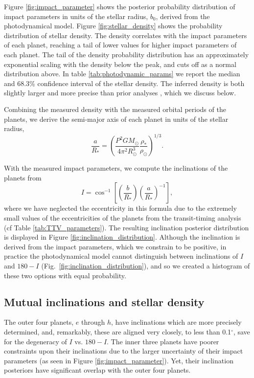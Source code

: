 \documentclass[twocolumn]{aastex63}
\begin{document}
Figure \ref{fig:impact_parameter} shows the posterior probability distribution of impact
parameters in units of the stellar radius, $b_0$, derived from the photodynamical 
model.  Figure \ref{fig:stellar_density} shows the probability distribution of stellar 
density.  The density correlates with the impact
parameters of each planet, reaching a tail of lower values
for higher impact parameters of each planet.  The tail of the density probability
distribution has an approximately exponential scaling with the density below the
peak, and cuts off as a normal distribution above.  In table \ref{tab:photodynamic_params} 
we report the median and 68.3\% confidence interval
of the stellar density.  The inferred density is both slightly larger and more precise
than prior analyses \citep{Delrez2018a}, which we discuss below.

Combining the measured density with the measured orbital periods of the planets,
we derive the semi-major axis of each planet in units of the stellar radius,
\begin{equation}
    \frac{a}{R_*} = \left(\frac{P^2 G M_\odot}{4\pi^2 R_\odot^3} \frac{\rho_*}{\rho_\odot}\right)^{1/3}.
\end{equation}

With the measured impact parameters, we compute the inclinations of the planets
from
\begin{equation}
    I = \cos^{-1}\left[ \left(\frac{b}{R_*}\right)
    \left(\frac{a}{R_*}\right)^{-1}\right],
\end{equation}
where we have neglected the eccentricity in this formula due to the extremely
small values of the eccentricities of the planets from the transit-timing
analysis (cf Table \ref{tab:TTV_parameters}).  The resulting inclination
posterior distribution is displayed in Figure \ref{fig:inclination_distribution}.  
Although the inclination is derived from the impact parameters, which we constrain 
to be positive, in practice the photodynamical model cannot distinguish between 
inclinations of $I$ and $180-I$ (Fig.\ \ref{fig:inclination_distribution}), and so we created a histogram of these two options 
with equal probability.

\subsection{Mutual inclinations and stellar density}

The outer four planets, $e$ through $h$, have inclinations which are more
precisely determined, and, remarkably, these are aligned
very closely, to less than 0.1$^\circ$, save for the degeneracy of $I$ vs.
$180-I$.  The inner three planets have poorer
constraints upon their inclinations due to the larger uncertainty of their
impact parameters (as seen in Figure \ref{fig:impact_parameter}).  Yet, their inclination posteriors have significant overlap
with the outer four planets.
\end{document}
